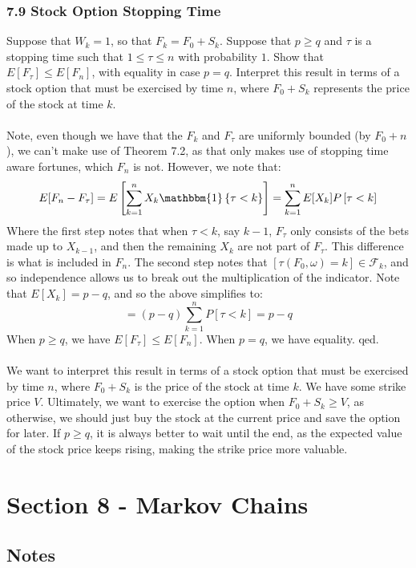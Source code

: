 \documentclass[12pt,a4paper]{article}
\newcommand{\1}[1]{\mathbbm{1}\left\{ #1 \right\}}
\newcommand{\fcal}{\mathcal{F}}
\begin{document}
\subsubsection{7.9 Stock Option Stopping Time} Suppose that $W_k = 1$, so that $F_k = F_0 + S_k$. Suppose that $p \geq q$ and $\tau$ is a stopping time such that $1 \leq \tau \leq n$ with probability $1$. Show that $E[F_\tau] \leq E[F_n]$, with equality in case $p = q$. Interpret this result in terms of a stock option that must be exercised by time $n$, where $F_0 + S_k$ represents the price of the stock at time $k$.
\\\\
Note, even though we have that the $F_k$ and $F_\tau$ are uniformly bounded (by $F_0 + n$), we can't make use of Theorem 7.2, as that only makes use of stopping time aware fortunes, which $F_n$ is not. However, we note that:
$$
	E[F_n - F_\tau] = E\left[\sum_{k=1}^n X_k \1{\tau < k}\right] = \sum_{k=1}^n E[X_k] P\left[\tau < k\right]
$$
Where the first step notes that when $\tau < k$, say $k - 1$, $F_\tau$ only consists of the bets made up to $X_{k - 1}$, and then the remaining $X_k$ are not part of $F_\tau$. This difference is what is included in $F_n$. The second step notes that $[\tau(F_0, \omega) = k] \in \fcal_k$, and so independence allows us to break out the multiplication of the indicator. Note that $E[X_k] = p - q$, and so the above simplifies to:
$$
	= \left(p - q\right) \sum_{k=1}^n P\left[\tau < k\right] = p - q
$$
When $p \geq q$, we have $E[F_\tau] \leq E[F_n]$. When $p = q$, we have equality. qed.
\\\\
We want to interpret this result in terms of a stock option that must be exercised by time $n$, where $F_0 + S_k$ is the price of the stock at time $k$. We have some strike price $V$. Ultimately, we want to exercise the option when $F_0 + S_k \geq V$, as otherwise, we should just buy the stock at the current price and save the option for later. If $p \geq q$, it is always better to wait until the end, as the expected value of the stock price keeps rising, making the strike price more valuable.

\section{Section 8 - Markov Chains}
\subsection{Notes}
\end{document}
